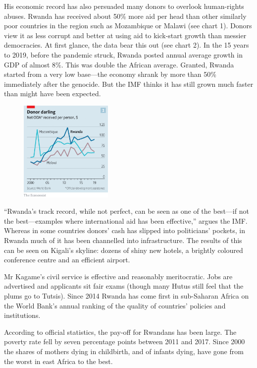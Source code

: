 \documentclass{article}
\begin{document}
His economic record has also persuaded many donors to overlook human-rights abuses. Rwanda has received about 50\% more aid per head than other similarly poor countries in the region such as Mozambique or Malawi (see chart 1). Donors view it as less corrupt and better at using aid to kick-start growth than messier democracies. At first glance, the data bear this out (see chart 2). In the 15 years to 2019, before the pandemic struck, Rwanda posted annual average growth in GDP of almost 8\%. This was double the African average. Granted, Rwanda started from a very low base---the economy shrank by more than 50\% immediately after the genocide. But the IMF thinks it has still grown much faster than might have been expected. 

\begin{figure}[h]
\centering
\includegraphics[width=0.4\textwidth]{images/20210327_MAC282.png}
\end{figure}


``Rwanda's track record, while not perfect, can be seen as one of the best---if not the best---examples where international aid has been effective,'' argues the IMF. Whereas in some countries donors' cash has slipped into politicians' pockets, in Rwanda much of it has been channelled into infrastructure. The results of this can be seen on Kigali's skyline: dozens of shiny new hotels, a brightly coloured conference centre and an efficient airport. 

Mr Kagame's civil service is effective and reasonably meritocratic. Jobs are advertised and applicants sit fair exams (though many Hutus still feel that the plums go to Tutsis). Since 2014 Rwanda has come first in sub-Saharan Africa on the World Bank's annual ranking of the quality of countries' policies and institutions. 

According to official statistics, the pay-off for Rwandans has been large. The poverty rate fell by seven percentage points between 2011 and 2017. Since 2000 the shares of mothers dying in childbirth, and of infants dying, have gone from the worst in east Africa to the best. 
\end{document}
